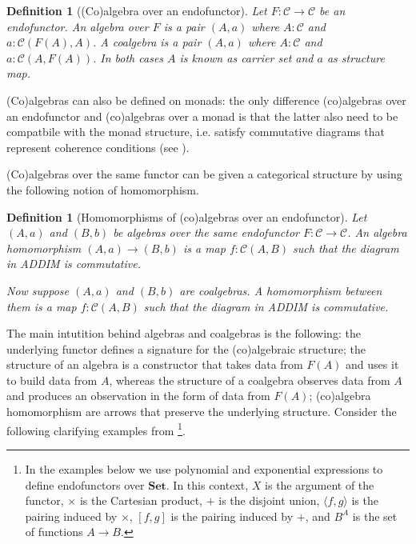 \documentclass[11pt,a4paper,openright,twoside]{report}
\theoremstyle{plain}
\newtheorem{definition}[proposition]{Definition}
\theoremstyle{definition}
\begin{document}
\begin{definition}[(Co)algebra over an endofunctor]
  \label{def: endalg}
  Let $F: \mathcal{C} \to \mathcal{C}$ be an endofunctor. An algebra over $F$ is a pair $(A,a)$ where $A: \mathcal{C}$ and $a:\mathcal{C}(F(A),A)$. A coalgebra is a pair $(A,a)$ where $A: \mathcal{C}$ and $a:\mathcal{C}(A,F(A))$. In both cases $A$ is known as carrier set and $a$ as structure map.
\end{definition}

(Co)algebras can also be defined on monads: the only difference (co)algebras over an endofunctor and (co)algebras over a monad is that the latter also need to be compatbile with the monad structure, i.e. satisfy commutative diagrams that represent coherence conditions (see \cite{gavranovicposition}).


(Co)algebras over the same functor can be given a categorical structure by using the following notion of homomorphism.

\begin{definition}[Homomorphisms of (co)algebras over an endofunctor]
  Let $(A,a)$ and $(B,b)$ be algebras over the same endofunctor $F: \mathcal{C} \to \mathcal{C}$. An algebra homomorphism $(A,a)\to (B,b)$ is a map $f: \mathcal{C}(A,B)$ such that the diagram in ADDIM is commutative.


  Now suppose $(A,a)$ and $(B,b)$ are coalgebras. A homomorphism between them is a map $f: \mathcal{C}(A,B)$ such that the diagram in ADDIM is commutative.
\end{definition}

The main intutition behind algebras and coalgebras is the following: the underlying functor defines a signature for the (co)algebraic structure; the structure of an algebra is a constructor that takes data from $F(A)$ and uses it to build data from $A$, whereas the structure of a coalgebra observes data from $A$ and produces an observation in the form of data from $F(A)$; (co)algebra homomorphism are arrows that preserve the underlying structure. Consider the following clarifying examples from \cite{gavranovicposition}\footnote{In the examples below we use polynomial and exponential expressions to define endofunctors over $\mathbf{Set}$. In this context, $X$ is the argument of the functor, $\times$ is the Cartesian product, $+$ is the disjoint union, $\langle f,g \rangle$ is the pairing induced by $\times$, $[f,g]$ is the pairing induced by $+$, and $B^A$ is the set of functions $A \to B$.}.
\end{document}
